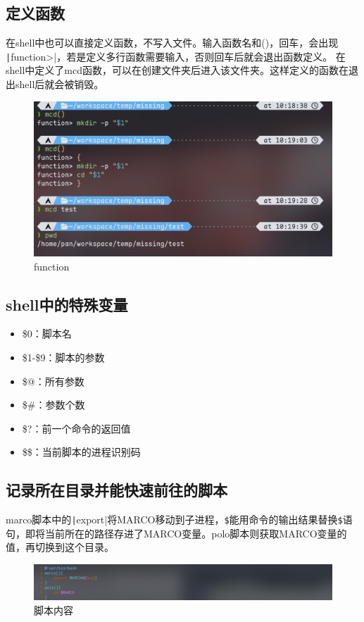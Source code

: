 \documentclass[fontset=ubuntu]{ctexart}
\begin{document}
\begin{sloppypar}
\subsection{定义函数}
在shell中也可以直接定义函数，不写入文件。输入函数名和()，回车，会出现
\texttt|function>|，若是定义多行函数需要输入{}，否则回车后就会退出函数定义。
在shell中定义了mcd函数，可以在创建文件夹后进入该文件夹。这样定义的函数在退出shell后就会被销毁。
\begin{figure}[htb]
    \centering
    \includegraphics[width=0.75\linewidth]{function_1.png}
    \caption{function}
    \label{fig:function_1}
\end{figure}

\subsection{shell中的特殊变量}
\begin{itemize}
    \item \$0：脚本名
    \item \$1-\$9：脚本的参数
    \item \$@：所有参数
    \item \$\#：参数个数
    \item \$?：前一个命令的返回值
    \item \$\$：当前脚本的进程识别码
\end{itemize}

\subsection{记录所在目录并能快速前往的脚本}
marco脚本中的\texttt|export|将MARCO移动到子进程，\verb|$|能用命令的输出结果替换\verb|$|语句，即将当前所在的路径存进了MARCO变量。polo脚本则获取MARCO变量的值，再切换到这个目录。
\begin{figure}[htb]
    \centering
    \includegraphics[width=0.75\linewidth]{marco_1.png}
    \caption{脚本内容}
    \label{fig:marco_1}
\end{figure}


\end{sloppypar}
\end{document}
